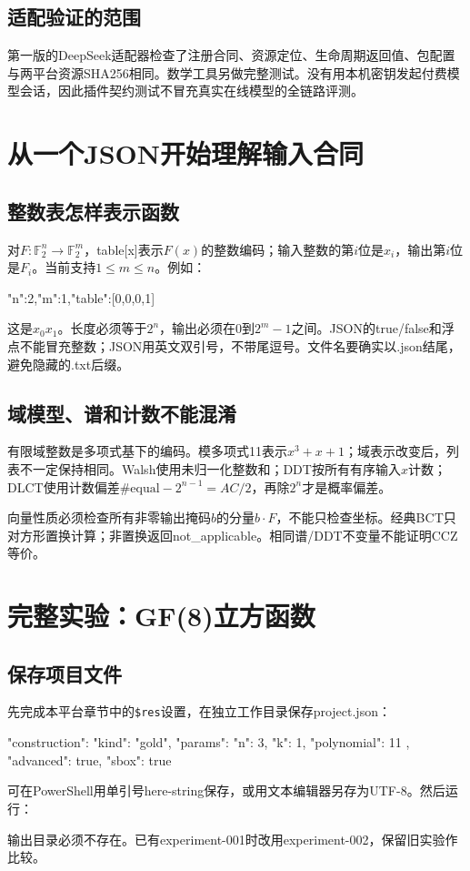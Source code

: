 \documentclass[UTF8,fontset=fandol,zihao=-4]{ctexrep}
\begin{document}
\section{适配验证的范围}
第一版的DeepSeek适配器检查了注册合同、资源定位、生命周期返回值、包配置与两平台资源SHA256相同。数学工具另做完整测试。没有用本机密钥发起付费模型会话，因此插件契约测试不冒充真实在线模型的全链路评测。

\chapter{从一个JSON开始理解输入合同}
\section{整数表怎样表示函数}
对$F:\mathbb F_2^n\to\mathbb F_2^m$，table[x]表示$F(x)$的整数编码；输入整数的第$i$位是$x_i$，输出第$i$位是$F_i$。当前支持$1\le m\le n$。例如：
\begin{code}
{"n":2,"m":1,"table":[0,0,0,1]}
\end{code}
这是$x_0x_1$。长度必须等于$2^n$，输出必须在$0$到$2^m-1$之间。JSON的true/false和浮点不能冒充整数；JSON用英文双引号，不带尾逗号。文件名要确实以.json结尾，避免隐藏的.txt后缀。

\section{域模型、谱和计数不能混淆}
有限域整数是多项式基下的编码。模多项式11表示$x^3+x+1$；域表示改变后，列表不一定保持相同。Walsh使用未归一化整数和；DDT按所有有序输入$x$计数；DLCT使用计数偏差$\#\mathrm{equal}-2^{n-1}=AC/2$，再除$2^n$才是概率偏差。

向量性质必须检查所有非零输出掩码$b$的分量$b\cdot F$，不能只检查坐标。经典BCT只对方形置换计算；非置换返回not\_applicable。相同谱/DDT不变量不能证明CCZ等价。

\chapter{完整实验：GF(8)立方函数}
\section{保存项目文件}
先完成本平台章节中的\texttt{\$res}设置，在独立工作目录保存project.json：
\begin{code}
{
  "construction": {
    "kind": "gold",
    "params": {"n": 3, "k": 1, "polynomial": 11}
  },
  "advanced": true,
  "sbox": true
}
\end{code}
可在PowerShell用单引号here-string保存，或用文本编辑器另存为UTF-8。然后运行：
输出目录必须不存在。已有experiment-001时改用experiment-002，保留旧实验作比较。
\end{document}
